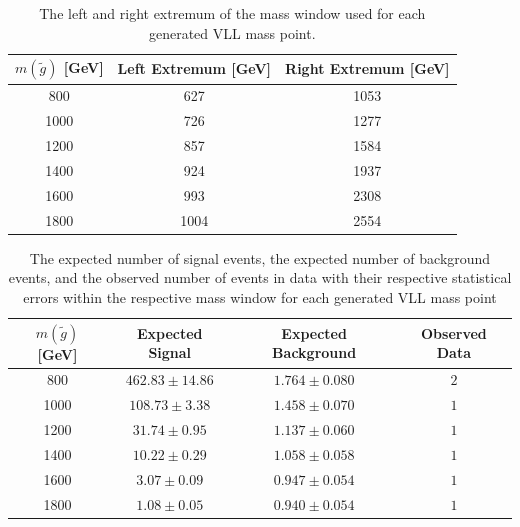 \begin{table}[!htbp]
  \begin{center}
    \begin{tabular}{ccc}
        \hline
        $m(\tilde{g})$ [GeV]  & Left Extremum [GeV] & Right Extremum [GeV] \\
        \hline
        800    & 627 & 1053 \\
        1000    & 726 & 1277 \\
        1200    & 857 & 1584 \\
        1400    & 924 & 1937 \\
        1600    & 993 & 2308 \\
        1800    & 1004 & 2554 \\
        \hline
    \end{tabular}
  \end{center}
  \caption{The left and right extremum of the mass window used for each generated \acs*{VLL} mass point.}
  \label{tab:window_stable}
\end{table}

\begin{table}[!htbp]
  \begin{center}
    \begin{tabular}{c|c|c|c}
      \hline
      $m(\tilde{g})$ [GeV]  & Expected Signal & Expected Background & Observed Data\\
      \hline
      800    & $462.83 \pm 14.86 $ & $1.764 \pm 0.080 $ & $2$ \\
      1000   & $108.73 \pm 3.38 $  & $1.458 \pm 0.070 $ & $1$ \\
      1200   & $31.74 \pm 0.95 $   & $1.137 \pm 0.060 $ & $1$ \\
      1400   & $10.22 \pm 0.29 $   & $1.058 \pm 0.058 $ & $1$ \\
      1600   & $3.07 \pm 0.09 $    & $0.947 \pm 0.054 $ & $1$ \\
      1800   & $1.08 \pm 0.05 $    & $0.940 \pm 0.054 $ & $1$ \\
      \hline
    \end{tabular}
  \end{center} 
  \caption{The expected number of signal events, the expected number of background events, and the observed number of events in data with their respective statistical errors within the respective mass window for each generated \acs*{VLL} mass point}
  \label{tab:counts_stable}
\end{table}

